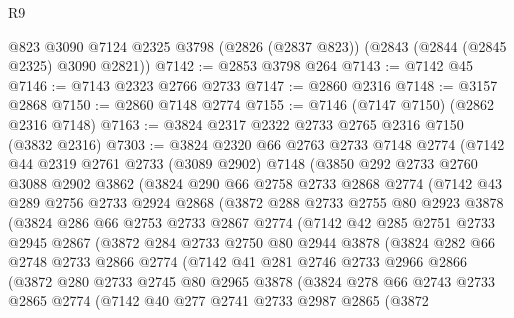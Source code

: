 \begin{lexlean}{R9}
\begin{coremodule}
    @823
    @3090
    @7124
    @2325
    @3798
    (@2826 (@2837 @823))
    (@2843 (@2844 (@2845 @2325) @3090 @2821))
@7142 := @2853 @3798 @264
@7143 := @7142 @45
@7146 := @7143 @2323 @2766 @2733
@7147 := @2860 @2316
@7148 := @3157 @2868
@7150 := @2860 @7148 @2774
@7155 := @7146 (@7147 @7150) (@2862 @2316 @7148)
@7163 := @3824 @2317 @2322 @2733 @2765 @2316 @7150 (@3832 @2316)
@7303 := @3824
    @2320
    @66
    @2763
    @2733
    @7148
    @2774
    (@7142
      @44
      @2319
      @2761
      @2733
      (@3089 @2902)
      @7148
      (@3850
        @292
        @2733
        @2760
        @3088
        @2902
        @3862
        (@3824
          @290
          @66
          @2758
          @2733
          @2868
          @2774
          (@7142
            @43
            @289
            @2756
            @2733
            @2924
            @2868
            (@3872
              @288
              @2733
              @2755
              @80
              @2923
              @3878
              (@3824
                @286
                @66
                @2753
                @2733
                @2867
                @2774
                (@7142
                  @42
                  @285
                  @2751
                  @2733
                  @2945
                  @2867
                  (@3872
                    @284
                    @2733
                    @2750
                    @80
                    @2944
                    @3878
                    (@3824
                      @282
                      @66
                      @2748
                      @2733
                      @2866
                      @2774
                      (@7142
                        @41
                        @281
                        @2746
                        @2733
                        @2966
                        @2866
                        (@3872
                          @280
                          @2733
                          @2745
                          @80
                          @2965
                          @3878
                          (@3824
                            @278
                            @66
                            @2743
                            @2733
                            @2865
                            @2774
                            (@7142
                              @40
                              @277
                              @2741
                              @2733
                              @2987
                              @2865
                              (@3872

\end{coremodule}
\end{lexlean}

